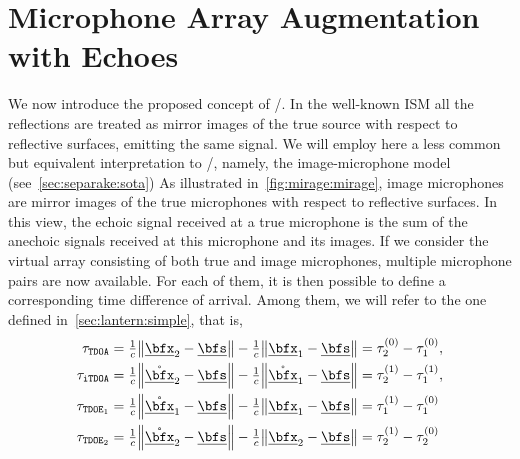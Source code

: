\section{Microphone Array Augmentation with Echoes}\label{sec:mirage:mirage}
We now introduce the proposed concept of \MIRAGEdef/.
In the well-known \acf{ISM} all the reflections are treated as mirror images of the true source with respect to reflective surfaces, emitting the same signal.
We will employ here a less common but equivalent interpretation to \ISM/, namely, the image-microphone model (see~\cref{sec:separake:sota})
As illustrated in~\cref{fig:mirage:mirage}, image microphones are mirror images of the true microphones with respect to reflective surfaces.
In this view, the echoic signal received at a true microphone is the sum of the anechoic signals received at this microphone and its images.
If we consider the virtual array consisting of both true and image microphones, multiple microphone pairs are now available.
For each of them, it is then possible to define a corresponding time difference of arrival.
Among them, we will refer to the one defined in~\cref{sec:lantern:simple}, that is,
\begin{equation}
    \begin{aligned}
        \tau_\mathtt{TDOA}  &= \tfrac{1}{c} \norm{\positionMicrophone_2 - \positionSource} - \tfrac{1}{c} \norm{\positionMicrophone_1 - \positionSource} = \tau_2^{(0)} - \tau_1^{(0)},\\
        \tau_\mathtt{iTDOA} &= \tfrac{1}{c} \norm{\mathring{\positionMicrophone}_2 - \positionSource} - \tfrac{1}{c} \norm{\mathring{\positionMicrophone}_1 - \positionSource} = \tau_2^{(1)} - \tau_1^{(1)},\\
        \tau_{\mathtt{TDOE}_1}  &= \tfrac{1}{c} \norm{\mathring{\positionMicrophone}_1 - \positionSource} - \tfrac{1}{c} \norm{\positionMicrophone_1 - \positionSource} = \tau_1^{(1)} - \tau_1^{(0)}\\
        \tau_{\mathtt{TDOE}_2}  &= \tfrac{1}{c} \norm{\mathring{\positionMicrophone}_2 - \positionSource} - \tfrac{1}{c} \norm{\positionMicrophone_2 - \positionSource} = \tau_2^{(1)} - \tau_2^{(0)}
    \end{aligned}
\end{equation}
